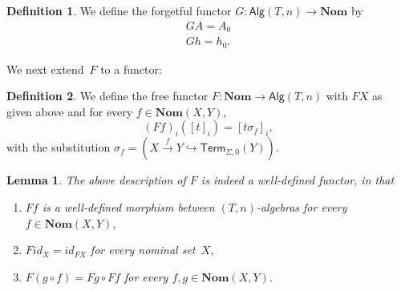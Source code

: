 \documentclass[11pt,a4paper]{amsart}
\newtheorem{lemma}[lemma]{Lemma}
\newcommand{\Alg}{\mathsf{Alg}}
\newcommand{\Term}{\mathsf{Term}}
\newcommand{\sig}{\Sigma}
\theoremstyle{plain}
\newcommand{\id}{\mathit{id}}
\numberwithin{equation}{section}
\newcommand{\+}[1]{\mathcal{#1}\xspace}
\newcommand{\Nom}{\mathbf{Nom}}
\theoremstyle{definition}
\newtheorem{defn}[defn]{Definition}
\begin{document}
\begin{defn}\label{def:forgetfulfunctor}
    We define the forgetful functor \(G: \Alg(T, n) \to \Nom\) by
    \begin{gather*}
        GA = A_0 \\
        Gh = h_0.
    \end{gather*}
\end{defn}
\noindent We next extend~$F$ to a functor:
\begin{defn}\label{def:freefunctor}
    We define the free functor \(F\colon \Nom \to \Alg(T, n)\) with \(FX\) as given above and for every \(f \in \Nom(X, Y)\),
    \[
        (Ff)_i([t]_i) = [t\sigma_f]_i,
    \]
    with the substitution \(\sigma_f = (X \xrightarrow{f} Y \hookrightarrow \Term_{\sig, 0}(Y))\).
\end{defn}

\begin{lemma}
    The above description of \(F\) is indeed a well-defined functor, in that
    \begin{enumerate}
        \item \(Ff\) is a well-defined morphism between \((T, n)\)-algebras for every \(f \in \Nom(X, Y)\),
        \item \(F\id_X = \id_{FX}\) for every nominal set~\(X\),
        \item \(F(g \circ f) = Fg \circ Ff\) for every \(f, g \in \Nom(X, Y)\).
    \end{enumerate}
\end{lemma}
\end{document}
